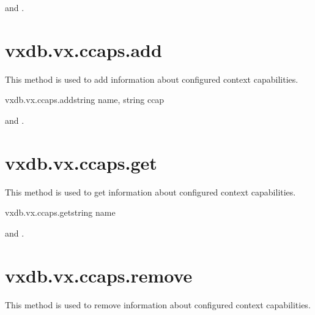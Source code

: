 \begin{rpcaccess}
 and \rpcownerchecks.
\end{rpcaccess}

\rpcreturnnil

\rpcnoerrors


\section{vxdb.vx.ccaps.add}

This method is used to add information about configured context capabilities.

\begin{rpcsynopsis}{vxdb.vx.ccaps.add}{string name, string ccap}
\end{rpcsynopsis}

\begin{rpcaccess}
 and \rpcownerchecks.
\end{rpcaccess}

\rpcreturnnil

\rpcnoerrors


\section{vxdb.vx.ccaps.get}

This method is used to get information about configured context capabilities.

\begin{rpcsynopsis}{vxdb.vx.ccaps.get}{string name}
\end{rpcsynopsis}

\begin{rpcaccess}
 and \rpcownerchecks.
\end{rpcaccess}


\rpcnoerrors


\section{vxdb.vx.ccaps.remove}

This method is used to remove information about configured context
capabilities.

